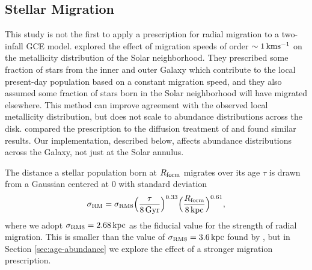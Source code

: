 \documentclass[twocolumn,twocolappendix,linenumbers]{aastex631}
\newcommand{\kpc}{\,{\rm kpc}}
\begin{document}
\subsection{Stellar Migration}
\label{sec:migration}

This study is not the first to apply a prescription for radial migration to a two-infall GCE model. \citet{spitoni_effect_2015} explored the effect of migration speeds of order $\sim1\,{\rm km}{\rm s}^{-1}$ on the metallicity distribution of the Solar neighborhood. They prescribed some fraction of stars from the inner and outer Galaxy which contribute to the local present-day population based on a constant migration speed, and they also assumed some fraction of stars born in the Solar neighborhood will have migrated elsewhere. This method can improve agreement with the observed local metallicity distribution, but does not scale to abundance distributions across the disk. \citet{palla_mgfe_2022} compared the \citet{spitoni_effect_2015} prescription to the diffusion treatment of \citet{frankel_measuring_2018} and found similar results. Our implementation, described below, affects abundance distributions across the Galaxy, not just at the Solar annulus.


The distance a stellar population born at $R_{\rm form}$ migrates over its age $\tau$ is drawn from a Gaussian centered at 0 with standard deviation
\begin{equation}
    \sigma_{\rm RM} = \sigma_{\rm RM8} \Big(\frac{\tau}{8\,{\rm Gyr}}\Big)^{0.33} \Big(\frac{R_{\rm form}}{8\kpc}\Big)^{0.61},
    \label{eq:radial-migration}
\end{equation}
where we adopt $\sigma_{\rm RM8}=2.68\kpc$ as the fiducial value for the strength of radial migration. This is smaller than the value of $\sigma_{\rm RM8}=3.6\kpc$ found by \citet{frankel_measuring_2018}, but in Section \ref{sec:age-abundance} we explore the effect of a stronger migration prescription.
\end{document}
